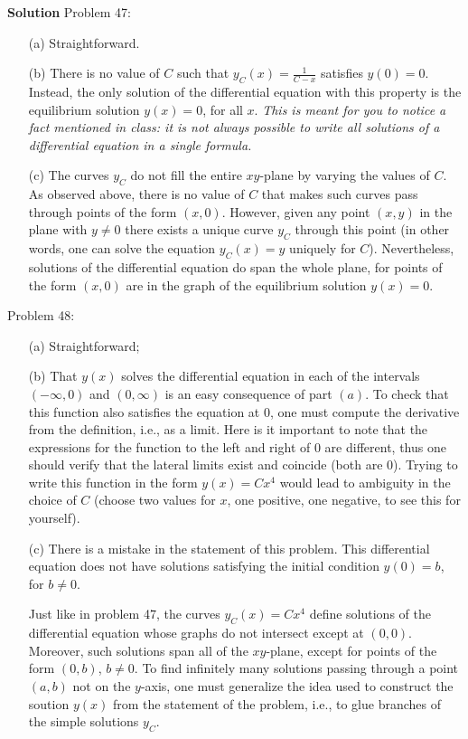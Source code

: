 \documentclass[12pt,oneside]{exam}
\newenvironment{newsolution}{\vspace{.1in}\noindent\textbf{Solution \hspace{.05em}}}{}
\begin{document}
\begin{newsolution}
Problem 47: 
\begin{itemize}
\item[(a)] Straightforward.
\item[(b)] There is no value of $C$ such that $y_{C}(x)=\frac{1}{C-x}$ satisfies $y(0)=0$. Instead, the only solution of the differential equation with this property is the equilibrium solution $y(x)=0$, for all $x$. \textit{This is meant for you to notice a fact mentioned in class: it is not always possible to write all solutions of a differential equation in a single formula.}
\item[(c)] The curves $y_C$ do not fill the entire $xy$-plane by varying the values of $C$. As observed above, there is no value of $C$ that makes such curves pass through points of the form $(x,0)$. However, given any point $(x,y)$ in the plane with $y\neq 0$ there exists a unique curve $y_C$ through this point (in other words, one can solve the equation $y_C(x)=y$ uniquely for $C$). 
Nevertheless, solutions of the differential equation do span the whole plane, for points of the form $(x,0)$ are in the graph of the equilibrium solution $y(x)=0$. 
\end{itemize}

Problem 48: 
\begin{itemize}
\item[(a)] Straightforward; 
\item[(b)] That $y(x)$ solves the differential equation in each of the intervals $(-\infty, 0)$ and $(0,\infty)$ is an easy consequence of part $(a)$. To check that this function also satisfies the equation at $0$, one must compute the derivative from the definition, i.e., as a limit. Here is it important to note that the expressions for the function to the left and right of $0$ are different, thus one should verify that the lateral limits exist and coincide (both are $0$).  Trying to write this function in the form $y(x)=Cx^4$ would lead to ambiguity in the choice of $C$ (choose two values for $x$, one positive, one negative, to see this for yourself). 
\item[(c)] There is a mistake in the statement of this problem. This differential equation does not have solutions satisfying the initial condition $y(0)=b$, for $b\neq0$. 

Just like in problem 47, the curves $y_C(x)=Cx^4$ define solutions of the differential equation whose graphs do not intersect except at $(0,0)$. Moreover, such solutions span all of the $xy$-plane, except for points of the form $(0,b)$, $b\neq 0$.  To find infinitely many solutions passing through a point $(a,b)$ not on the $y$-axis, one must generalize the idea used to construct the soution $y(x)$ from the statement of the problem, i.e., to glue branches of the simple solutions $y_C$. 


\end{itemize}
\end{newsolution}
\end{document}
